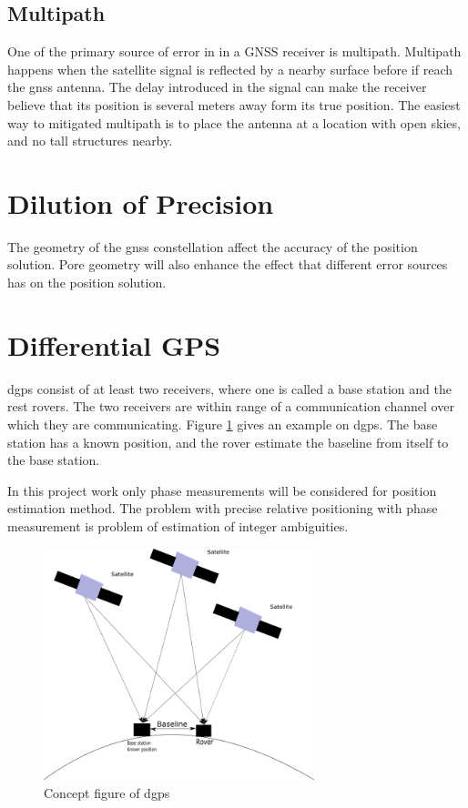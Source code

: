 \subsection{Multipath}
One of the primary source of error in in a GNSS receiver is multipath. Multipath happens when the satellite signal is reflected by a nearby surface before if reach the \gls{gnss} antenna. The delay introduced in the signal can make the receiver believe that its position is several meters away form its true position. The easiest way to mitigated multipath is to place the antenna at a location with open skies, and no tall structures nearby.
\section{Dilution of Precision}
The geometry of the \gls{gnss} constellation affect the accuracy of the position solution. Pore geometry will also enhance the effect that different error sources has on the position solution.
\section{Differential GPS}
\acrfull{dgps} consist of at least two receivers, where one is called a base station and the rest rovers. The two receivers are within range of a communication channel over which they are communicating. Figure \ref{figure:DGPS} gives an example on \gls{dgps}. The base station has a known position, and the rover estimate the baseline from itself to the base station.

In this project work only phase measurements will be considered for position estimation method.
The problem with precise relative positioning with phase measurement is problem of estimation of integer ambiguities.

\begin{figure}[H]
	\centering
		\includegraphics[width=0.7\textwidth]{figs/DGPS.png}
		\caption{Concept figure of \acrfull{dgps}}
		\label{figure:DGPS}
\end{figure}
